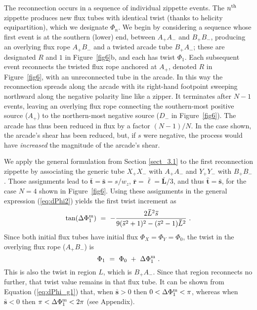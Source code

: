 \documentclass[10pt,namedreferneces]{SolarPhysics}
\begin{document}
\begin{article}
The reconnection occurs in a sequence of individual zippette events.  The $n^{\rm th}$ zippette  produces new flux tubes with identical twist (thanks to helicity equipartition), which we designate $\Phi_n$.  We begin by considering a sequence whose first event is at the southern (lower) end, between $A_+A_-$ and $B_+B_-$, producing an overlying flux rope $A_+B_-$ and a twisted arcade tube $B_+A_-$; these are designated $R$ and $1$ in Figure\ \ref{fig6}b, and each has twist $\Phi_1$.   Each subsequent event reconnects the twisted flux rope anchored at $A_+$, denoted $R$ in Figure\ \ref{fig6}, with an unreconnected tube in the arcade.  In this way the reconnection spreads along the arcade with its right-hand footpoint sweeping northward along the negative polarity line like a zipper. It  terminates after $N-1$ events, leaving an overlying flux rope connecting the southern-most positive source ($A_+$) to the northern-most negative source ($D_-$ in Figure\ \ref{fig6}). The arcade has thus been reduced in flux by a factor $(N-1)/N$. In the case shown, the arcade's shear has been reduced, but, if $s$ were negative, the process would have {\em increased} the magnitude of the arcade's shear.

We apply the general formulation from Section \ref{sect_3.1} to the first reconnection zippette by associating the generic tube $X_+X_-$ with $A_+A_-$ and $Y_+Y_-$ with $B_+B_-$.  Those assignments lead to 
 $\bm\bar{t}=\bm\bar{s}=s/w_z$, $\bm\bar{r}=\bm\bar{\ell}=\bm\bar{L}/3$, and thus $\bm\hat{t}=\bm\bar{s}$, for the case $N=4$ shown in Figure\ \ref{fig6}.  Using these assignments in the general expression (\ref{eq:dPhi2}) yields the first twist increment as
\begin{equation}
  \tan(\Delta\Phi_1^{\rm m}) ~=~ -{2\bm\bar{L}^2\bm\bar{s}\over 9(\bm\bar{s}^2+1)^2 - (\bm\bar{s}^2-1)\bm\bar{L}^2} ~.
  	\label{eq:dPhi_g1}
\end{equation}
Since both initial flux tubes have initial flux $\Phi_X=\Phi_Y=\Phi_0$, the twist in the overlying flux rope ($A_+B_-$) is 
\begin{equation}
  \Phi_1 ~=~\Phi_0~+~\Delta\Phi_1^{\rm m}~. 
  	\label{eq:Phi_1} 
\end{equation}
This is also the twist in region $L$, which is $B_+A_-$.  Since that region reconnects no further, that twist value  remains in that flux tube. 
It can be shown from Equation (\ref{eq:dPhi_g1}) that, when $\bm\bar{s}>0$ then $0<\Delta\Phi_1^{\rm m}<\pi$, whereas when $\bm\bar{s}<0$ then $\pi<\Delta\Phi_1^{\rm m}<2\pi$ (see Appendix).


\end{article}
\end{document}

